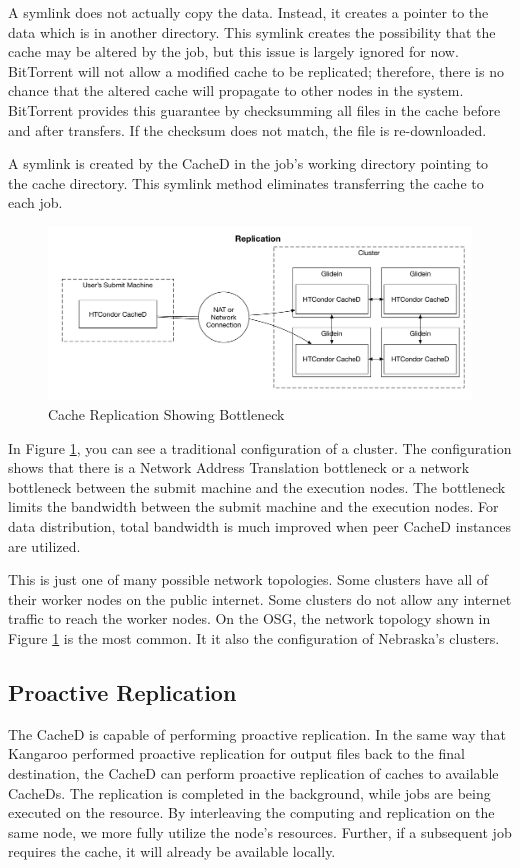 A symlink does not actually copy the data.  Instead, it creates a pointer to the data which is in another directory.  This symlink creates the possibility that the cache may be altered by the job, but this issue is largely ignored for now.  BitTorrent will not allow a modified cache to be replicated; therefore, there is no chance that the altered cache will propagate to other nodes in the system.  BitTorrent provides this guarantee by checksumming all files in the cache before and after transfers.  If the checksum does not match, the file is re-downloaded.

A symlink is created by the CacheD in the job's working directory pointing to the cache directory.  This symlink method eliminates transferring the cache to each job.

\begin{figure}[ht]
\centering
\includegraphics[width=\textwidth]{images/ReplicationBottleneck.pdf}
\caption{Cache Replication Showing Bottleneck}
\label{fig:cachebottleneck}
\end{figure}

In Figure \ref{fig:cachebottleneck}, you can see a traditional configuration of a cluster.  The configuration shows that there is a Network Address Translation bottleneck or a network bottleneck between the submit machine and the execution nodes.  The bottleneck limits the bandwidth between the submit machine and the execution nodes.  For data distribution, total bandwidth is much improved when peer CacheD instances are utilized.

This is just one of many possible network topologies.  Some clusters have all of their worker nodes on the public internet.  Some clusters do not allow any internet traffic to reach the worker nodes.  On the OSG, the network topology shown in Figure \ref{fig:cachebottleneck} is the most common.  It it also the configuration of Nebraska's clusters.


\subsection{Proactive Replication}
The CacheD is capable of performing proactive replication.  In the same way that Kangaroo performed proactive replication for output files back to the final destination, the CacheD can perform proactive replication of caches to available CacheDs.  The replication is completed in the background, while jobs are being executed on the resource.  By interleaving the computing and replication on the same node, we more fully utilize the node's resources.  Further, if a subsequent job requires the cache, it will already be available locally.

